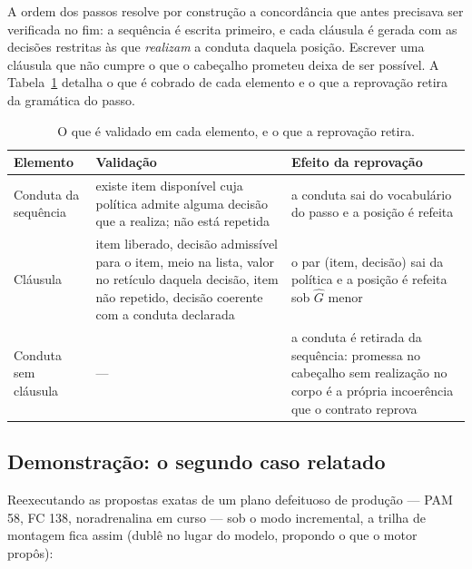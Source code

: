 \documentclass[11pt,a4paper]{article}
\begin{document}
A ordem dos passos resolve por construção a concordância que antes precisava ser
verificada no fim: a sequência é escrita primeiro, e cada cláusula é gerada com
as decisões restritas às que \emph{realizam} a conduta daquela posição. Escrever
uma cláusula que não cumpre o que o cabeçalho prometeu deixa de ser possível.
A Tabela~\ref{tab:elementos} detalha o que é cobrado de cada elemento e o que a
reprovação retira da gramática do passo.

\begin{table}[h]
\centering
\small
\caption{O que é validado em cada elemento, e o que a reprovação retira.}
\label{tab:elementos}
\begin{tabular}{@{}p{2.6cm}p{6.4cm}p{5.6cm}@{}}
\toprule
\textbf{Elemento} & \textbf{Validação} & \textbf{Efeito da reprovação} \\
\midrule
Conduta da sequência &
existe item disponível cuja política admite alguma decisão que a realiza; não
está repetida &
a conduta sai do vocabulário do passo e a posição é refeita \\
\addlinespace
Cláusula &
item liberado, decisão admissível para o item, meio na lista, valor no retículo
daquela decisão, item não repetido, decisão coerente com a conduta declarada &
o par (item, decisão) sai da política e a posição é refeita sob $\hat{G}$ menor \\
\addlinespace
Conduta sem cláusula &
--- &
a conduta é retirada da sequência: promessa no cabeçalho sem realização no corpo
é a própria incoerência que o contrato reprova \\
\bottomrule
\end{tabular}
\end{table}

\subsection{Demonstração: o segundo caso relatado}

Reexecutando as propostas exatas de um plano defeituoso de produção
--- PAM 58, FC 138, noradrenalina em curso --- sob o modo incremental, a trilha
de montagem fica assim (dublê no lugar do modelo, propondo o que o motor
propôs):
\end{document}
